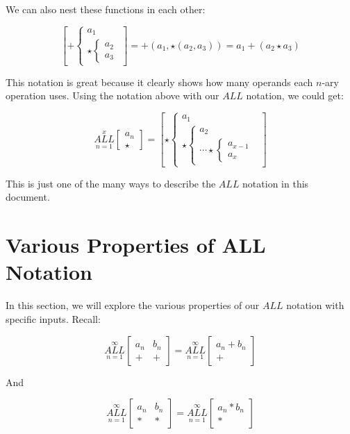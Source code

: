 \documentclass{article}
\begin{document}
We can also nest these functions in each other:

$$\left[ + \left\{ \begin{array}{rcl}
a_1 \\ \star \left\{  \begin{array} {rcl} a_2 \\ a_3\end{array} \right. \end{array}\right. \right] = +(a_1,\star(a_2,a_3))=a_1+(a_2 \star a_3)$$

This notation is great because it clearly shows how many operands each $n$-ary operation uses. Using the notation above with our $ALL$ notation, we could get:

$$\underset{n=1}{\overset{x}{ALL}} \begin{bmatrix}
a_n \\
\star
\end{bmatrix}=\left[ \star \left\{ \begin{array}{rcl}
a_1 \\ \star \left\{  \begin{array} {rcl} a_2 \\ \cdots  \star \left\{ \begin{array}{rcl}
a_{x-1} \\ a_x \end{array} \right. \end{array} \right. \end{array}\right. \right]$$

This is just one of the many ways to describe the $ALL$ notation in this document.

\section{Various Properties of ALL Notation}

In this section, we will explore the various properties of our $ALL$ notation with specific inputs.
Recall:

$$\underset{n=1}{\overset{\infty}{ALL}} \begin{bmatrix}
a_n & b_n \\
+& +
\end{bmatrix} = \underset{n=1}{\overset{\infty}{ALL}} \begin{bmatrix}
a_n + b_n \\
 +
\end{bmatrix}$$

And

$$\underset{n=1}{\overset{\infty}{ALL}} \begin{bmatrix}
a_n & b_n \\
*& *
\end{bmatrix} = \underset{n=1}{\overset{\infty}{ALL}} \begin{bmatrix}
a_n * b_n \\
 *
\end{bmatrix}$$
\end{document}
